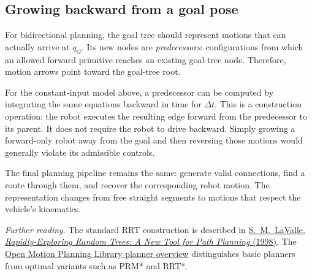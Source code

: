 \subsection{Growing backward from a goal pose}
For bidirectional planning, the goal tree should represent motions that
can actually arrive at $q_G$. Its new nodes are \emph{predecessors}:
configurations from which an allowed forward primitive reaches an existing
goal-tree node. Therefore, motion arrows point toward the goal-tree root.

For the constant-input model above, a predecessor can be computed by
integrating the same equations backward in time for $\Delta t$. This is
a construction operation: the robot executes the resulting edge forward
from the predecessor to its parent. It does not require the robot to drive
backward. Simply growing a forward-only robot away from the goal and then
reversing those motions would generally violate its admissible controls.

The final planning pipeline remains the same: generate valid connections,
find a route through them, and recover the corresponding robot motion.
The representation changes from free straight segments to motions that
respect the vehicle's kinematics.

\smallskip
\textit{Further reading.} The standard RRT construction is described in
\href{https://lavalle.pl/papers/Lav98c.pdf}{S.~M.~LaValle,
\emph{Rapidly-Exploring Random Trees: A New Tool for Path Planning} (1998)}.
The \href{https://ompl.kavrakilab.org/planners.html}{Open Motion Planning
Library planner overview} distinguishes basic planners from optimal variants
such as PRM* and RRT*.
